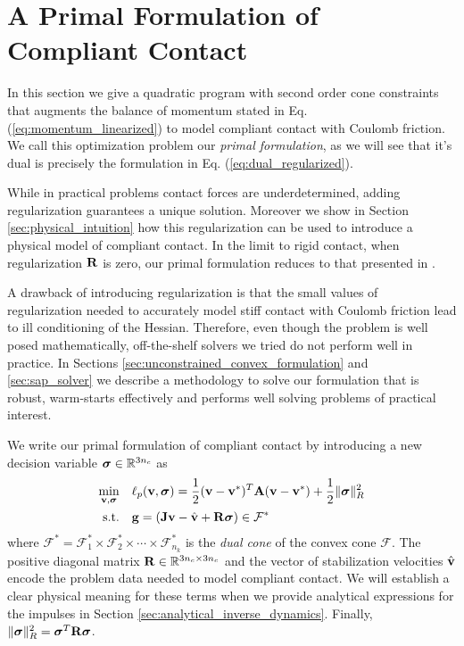
\section{A Primal Formulation of Compliant Contact}
In this section we give a quadratic program with second order cone constraints
that augments the balance of momentum stated in Eq.
(\ref{eq:momentum_linearized}) to model compliant contact with Coulomb friction.
We call this optimization problem our \emph{primal formulation}, as we will see
that it's dual is precisely the formulation in Eq. (\ref{eq:dual_regularized}).

While in practical problems contact forces are underdetermined, adding
regularization guarantees a unique solution. Moreover we show in Section
\ref{sec:physical_intuition} how this regularization can be used to introduce a
physical model of compliant contact. In the limit to rigid contact, when
regularization ${\mathbf{R}}$ is zero, our primal formulation reduces to that
presented in \cite{bib:mazhar2014}.

A drawback of introducing regularization is that the small values of
regularization needed to accurately model stiff contact with Coulomb friction
lead to ill conditioning of the Hessian. Therefore, even though the problem is
well posed mathematically, off-the-shelf solvers we tried do not perform well in
practice. In Sections \ref{sec:unconstrained_convex_formulation} and
\ref{sec:sap_solver} we describe a methodology to solve our formulation that is
robust, warm-starts effectively and performs well solving problems of practical
interest.

We write our primal formulation of compliant contact by introducing a new
decision variable ${\bm{\sigma}}\in\mathbb{R}^{3n_c}$ as
\begin{equation}
	\begin{aligned}
	\min_{\mf{v},\bsigma} \quad & \ell_p(\mf{v},\bsigma) = \frac{1}{2}(\mf{v}-\mf{v}^*)^T\mf{A}(\mf{v}-\mf{v}^*) + \frac{1}{2} \Vert\bsigma\Vert_{R}^2\\
	\textrm{s.t.} \quad & \mf{g} = (\mf{J}\mf{v}-\hat{\mf{v}} + \mf{R}\bsigma) \in \mathcal{F}^*\\
	\end{aligned}
	\label{eq:primal_regularized}
\end{equation}
where $\mathcal{F^*}= \mathcal{F}^*_1 \times \mathcal{F}^*_2 \times \cdots \times \mathcal{F}^*_{n_k}$ is the \emph{dual cone} of the convex
cone $\mathcal{F}$. The positive diagonal matrix ${\mathbf{R}}\in\mathbb{R}^{3n_c\times
3n_c}$ and the vector of stabilization velocities $\hat{{\mathbf{v}}}$ encode the
problem data needed to model compliant contact. We will establish a clear
physical meaning for these terms when we provide analytical expressions for the
impulses in Section \ref{sec:analytical_inverse_dynamics}. Finally,
$\Vert{\bm\sigma}\Vert_R^2={\bm\sigma}^T{\mathbf{R}}{\bm\sigma}$.

